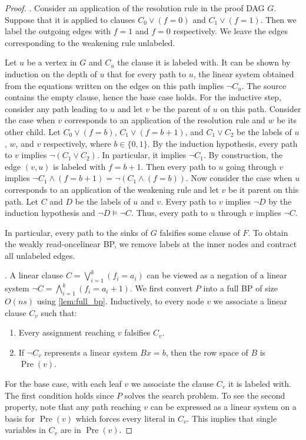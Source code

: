 \documentclass[10pt,a4paper]{article}
\theoremstyle{definition}
\theoremstyle{remark}
\DeclareMathOperator{\pre}{Pre}
\newcommand{\wreadonce}{weakly read-once}
\begin{document}
\begin{proof}
   .
  Consider an application of the resolution rule in the proof DAG $G$. Suppose that it is applied to clauses $C_0 \lor (f = 0)$ and $C_1 \lor (f = 1)$. Then we label the outgoing edges with $f=1$ and $f=0$ respectively.
  We leave the edges corresponding to the weakening rule unlabeled.

  Let $u$ be a vertex in $G$ and $C_u$ the clause it is labeled with. It can be shown by induction on the depth of $u$ that for every path to $u$, the linear system obtained from the equations written on the edges on this path implies $\neg C_u$. The source contains the empty clause, hence the base case holds. For the inductive step, consider any path leading to $u$ and let $v$ be the parent of $u$ on this path. Consider the case when $v$ corresponds to an application of the resolution rule and $w$ be its other child. Let $C_0 \lor (f=b)$, $C_1 \lor (f=b+1)$, and $C_1 \lor C_2$ be the labels of $u$, $w$, and $v$ respectively, where $b \in \{0,1\}$. By the induction hypothesis, every path to $v$ implies $\neg (C_1 \lor C_2)$. In particular, it implies $\neg C_1$. By construction, the edge $(v, u)$ is labeled with $f=b+1$. Then every path to $u$ going through $v$ implies $\neg C_1 \land (f=b+1) = \neg (C_1 \land (f = b))$. Now consider the case when $u$ corresponds to an application of the weakening rule and let $v$ be it parent on this path. Let $C$ and $D$ be the labels of $u$ and $v$. Every path to $v$ implies $\neg D$ by the induction hypothesis and $\neg D \vDash \neg C$. Thus, every path to $u$ through $v$ implies $\neg C$.

  In particular, every path to the sinks of $G$ falsifies some clause of $F$. To obtain the \wreadonce linear BP, we remove labels at the inner nodes and contract all unlabeled edges.

  \medskip
  .
%
  A linear clause $C = \bigvee_{i=1}^k (f_i = a_i)$ can be viewed as a negation of a linear system $\neg C = \bigwedge_{i=1}^k (f_i = a_i + 1)$.
  We first convert $P$ into a full BP of size $O(ns)$ using \cref{lem:full_bp}. Inductively, to every node $v$ we associate a linear clause $C_v$ such that:
  \begin{enumerate}
    \item Every assignment reaching $v$ falsifies $C_v$.
    \item If $\neg C_v$ represents a linear system $Bx = b$, then the row space of $B$ is $\pre(v)$.
  \end{enumerate}
  For the base case, with each leaf $v$ we associate the clause $C_v$ it is labeled with. The first condition holds since $P$ solves the search problem. To see the second property, note that any path reaching $v$ can be expressed as a linear system on a basis for $\pre(v)$ which forces every literal in $C_v$. This implies that single variables in $C_v$ are in $\pre(v)$.


\end{proof}
\end{document}
